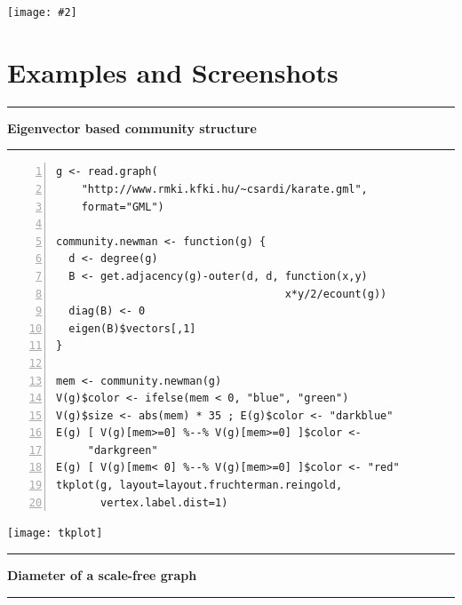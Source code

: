 \documentclass[a0]{sciposter}
\newcommand{\figfigure}[2]{%
  \begin{psfrags}
  
  \texttt{[image: \#2]}
  \end{psfrags}
}
\begin{document}
\begin{multicols}{3}
\begin{center}
\figfigure{\columnwidth}{arch}
\end{center}

\section{Examples and Screenshots}




\vspace{20pt}\hrule\vspace{20pt}
\centerline{\bf Eigenvector based community structure}
\vspace{20pt}\hrule\vspace{20pt}

\begin{Verbatim}[fontsize=\small,numbers=left]
g <- read.graph(
    "http://www.rmki.kfki.hu/~csardi/karate.gml", 
    format="GML")

community.newman <- function(g) {
  d <- degree(g)
  B <- get.adjacency(g)-outer(d, d, function(x,y) 
                                    x*y/2/ecount(g))
  diag(B) <- 0
  eigen(B)$vectors[,1]
}

mem <- community.newman(g)
V(g)$color <- ifelse(mem < 0, "blue", "green")
V(g)$size <- abs(mem) * 35 ; E(g)$color <- "darkblue"
E(g) [ V(g)[mem>=0] %--% V(g)[mem>=0] ]$color <- 
     "darkgreen"
E(g) [ V(g)[mem< 0] %--% V(g)[mem>=0] ]$color <- "red"
tkplot(g, layout=layout.fruchterman.reingold,
       vertex.label.dist=1)
\end{Verbatim}

\begin{center}
\texttt{[image: tkplot]}
\end{center}

\vspace{20pt}\hrule\vspace{20pt}
\centerline{\bf Diameter of a scale-free graph}
\vspace{20pt}\hrule\vspace{20pt}


\end{multicols}
\end{document}
